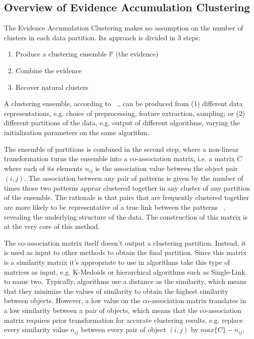 \subsection{Overview of Evidence Accumulation Clustering} 
The Evidence Accumulation Clustering makes no assumption on the number of clusters in each data partition. Its approach is divided in 3 steps:

\begin{enumerate}
\item Produce a clustering ensemble $\mathbb{P}$ (the evidence)
\item Combine the evidence
\item Recover natural clusters 
\end{enumerate}

A clustering ensemble, according to ~\cite{Fred2005}., can be produced from (1) different data representations, e.g. choice of preprocessing, feature extraction, sampling; or (2) different partitions of the data, e.g. output of different algorithms, varying the initialization parameters on the same algorithm.

The ensemble of partitions is combined in the second step, where a non-linear transformation turns the ensemble into a co-association matrix, i.e. a matrix $C$ where each of its elements $n_{ij}$ is the association value between the object pair $(i,j)$. The association between any pair of patterns is given by the number of times those two patterns appear clustered together in any cluster of any partition of the ensemble. The rationale is that pairs that are frequently clustered together are more likely to be representative of a true link between the patterns ~\cite{Fred2005}, revealing the underlying structure of the data.
The construction of this matrix is at the very core of this method.

The co-association matrix itself doesn't output a clustering partition. Instead, it is used as input to other methods to obtain the final partition. Since this matrix is a similarity matrix it's appropriate to use in algorithms take this type of matrices as input, e.g. K-Medoids or hierarchical algorithms such as Single-Link. to name two. Typically, algorithms use a distance as the similarity, which means that they minimize the values of similarity to obtain the highest similarity between objects. However, a low value on the co-association matrix translates in a low similarity between a pair of objects, which means that the co-association matrix requires prior transformation for accurate clustering results, e.g. replace every similarity value $n_{ij}$ between every pair of object $(i,j)$ by $max \{ C \} - n_{ij}$.


